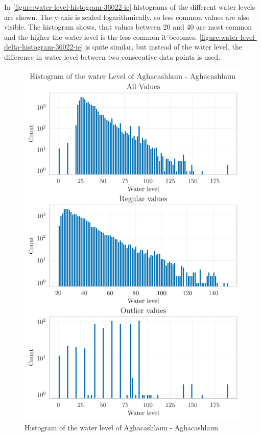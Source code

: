 In \autoref{figure:water-level-histogram-36022-ie} histograms of the different water levels are shown. The y-axis is scaled logarithmically, so less common values are also visible. The histogram shows, that values between 20 and 40 are most common and the higher the water level is the less common it becomes. \autoref{figure:water-level-delta-histogram-36022-ie} is quite similar, but instead of the water level, the difference in water level between two consecutive data points is used.
\begin{figure}[htp]
    \centering 
    \includegraphics{./plots/pdfs/36022-ie/water_level_histogram_36022-ie.pdf}
    \caption{Histogram of the water level of Aghacashlaun - Aghacashlaun}
    \label{figure:water-level-histogram-36022-ie}
\end{figure}

